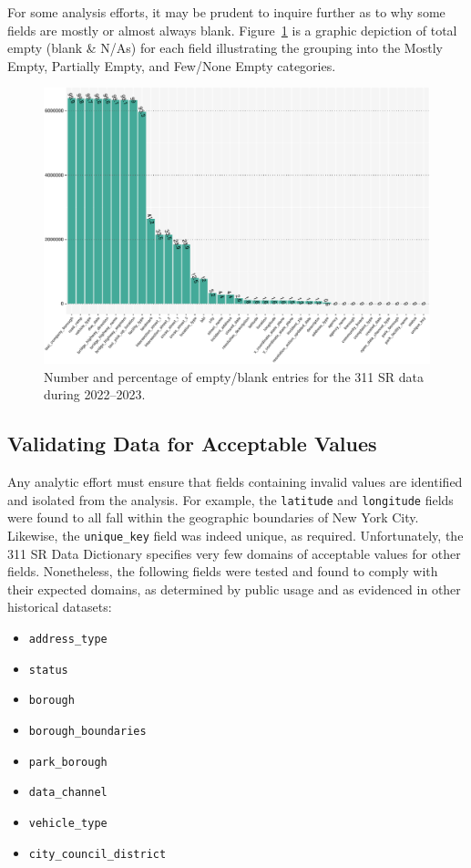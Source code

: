 \documentclass[linenumber]{jdsart}
\begin{document}
For some analysis efforts, it may be prudent to inquire 
further as to why some fields are mostly or almost 
always blank. Figure~\ref{fig:blank_fields} is 
a graphic depiction of total empty (blank \& N/As) for each 
field illustrating the grouping into the Mostly Empty, 
Partially Empty, and Few/None Empty categories.

\begin{figure}[tbp]
	\centering
  	\includegraphics[width=\textwidth]{BlankFields.pdf}
	\caption{Number and percentage of empty/blank entries for the
          311 SR data during 2022--2023.}
	\label{fig:blank_fields}
\end{figure}


\subsection{Validating Data for Acceptable Values}
\label{sec:domain}
Any analytic effort must ensure that fields containing invalid values 
are identified and isolated from the analysis. For example, the \texttt{latitude} 
and \texttt{longitude} fields were found to all fall within the 
geographic boundaries of New York City. Likewise, 
the \texttt{unique\_key} field was indeed unique, as required. 
Unfortunately, the 311 SR Data Dictionary specifies very few domains
of acceptable values for other fields. Nonetheless, the following
fields were tested and found to comply with their expected
domains, as determined by public
usage and as evidenced in other historical datasets:

\begin{itemize}[left=1.5em]
    \item \texttt{address\_type}
    \item \texttt{status}
    \item \texttt{borough}
    \item \texttt{borough\_boundaries}
    \item \texttt{park\_borough}
    \item \texttt{data\_channel}
    \item \texttt{vehicle\_type}
    \item \texttt{city\_council\_district}
\end{itemize}
\end{document}
